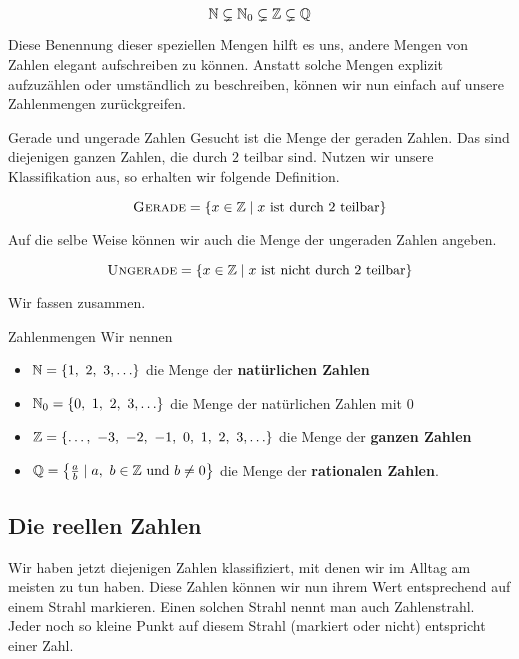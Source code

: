 \documentclass[../../main.tex]{subfiles}
\begin{document}
	$$\mathbb{N} \subsetneq \mathbb{N}_0 \subsetneq \mathbb{Z} \subsetneq \mathbb{Q}$$
	
	Diese Benennung dieser speziellen Mengen hilft es uns, andere Mengen von Zahlen elegant aufschreiben zu können. Anstatt solche Mengen explizit aufzuzählen oder umständlich zu beschreiben, können wir nun einfach auf unsere Zahlenmengen zurückgreifen.
	\begin{example}{Gerade und ungerade Zahlen}
		Gesucht ist die Menge der geraden Zahlen. Das sind diejenigen ganzen Zahlen, die durch $2$ teilbar sind. Nutzen wir unsere Klassifikation aus, so erhalten wir folgende Definition.
		
		$$\textsc{Gerade} = \left\{x\in\mathbb{Z} \mid x \text{ ist durch $2$ teilbar}\right\}$$
		
		Auf die selbe Weise können wir auch die Menge der ungeraden Zahlen angeben.
		
		$$\textsc{Ungerade} = \left\{x\in\mathbb{Z} \mid x \text{ ist nicht durch $2$ teilbar}\right\}$$
	\end{example}
	
	Wir fassen zusammen.
	
	\begin{definition}{Zahlenmengen}
		Wir nennen
		\begin{itemize}
			\item $\mathbb{N} = \left\{1,\ 2,\ 3,\ldots \right\}$ die Menge der \textbf{natürlichen Zahlen}
			\item $\Natural_0 = \left\{0, \ 1,\ 2,\ 3,\ldots \right\}$ die Menge der natürlichen Zahlen mit $0$
			\item $\mathbb{Z} = \left\{\ldots, \ -3, \ -2, \ -1, \ 0, \ 1, \ 2, \ 3, \ldots \right\}$ die Menge der \textbf{ganzen Zahlen}
			\item $\mathbb{Q} = \left\{ \frac{a}{b} \mid a, \ b \in \mathbb{Z} \text{ und } b \neq 0\right\}$ die Menge der \textbf{rationalen Zahlen}.
		\end{itemize}
	\end{definition}

	\subsection{Die reellen Zahlen}
	Wir haben jetzt diejenigen Zahlen klassifiziert, mit denen wir im Alltag am meisten zu tun haben. Diese Zahlen können wir nun ihrem Wert entsprechend auf einem Strahl markieren. Einen solchen Strahl nennt man auch Zahlenstrahl. Jeder noch so kleine Punkt auf diesem Strahl (markiert oder nicht) entspricht einer Zahl.
	
\end{document}
